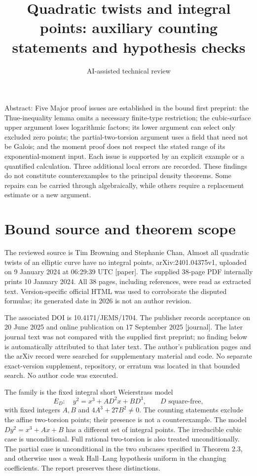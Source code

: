 \documentclass[10pt]{article}
\title{Quadratic twists and integral points: auxiliary counting statements and hypothesis checks}
\author{AI-assisted technical review}
\date{}
\begin{document}
\maketitle
Abstract: Five Major proof issues are established in the bound first preprint: the Thue-inequality lemma omits a necessary finite-type restriction; the cubic-surface upper argument loses logarithmic factors; its lower argument can select only excluded zero points; the partial-two-torsion argument uses a field that need not be Galois; and the moment proof does not respect the stated range of its exponential-moment input. Each issue is supported by an explicit example or a quantified calculation. Three additional local errors are recorded. These findings do not constitute counterexamples to the principal density theorems. Some repairs can be carried through algebraically, while others require a replacement estimate or a new argument.\par
\section*{Bound source and theorem scope}
The reviewed source is Tim Browning and Stephanie Chan, Almost all quadratic twists of an elliptic curve have no integral points, arXiv:2401.04375v1, uploaded on 9 January 2024 at 06:29:39 UTC [paper]. The supplied 38-page PDF internally prints 10 January 2024. All 38 pages, including references, were read as extracted text. Version-specific official HTML was used to corroborate the disputed formulas; its generated date in 2026 is not an author revision.\par
The associated DOI is 10.4171/JEMS/1704. The publisher records acceptance on 20 June 2025 and online publication on 17 September 2025 [journal]. The later journal text was not compared with the supplied first preprint; no finding below is automatically attributed to that later text. The author’s publication pages and the arXiv record were searched for supplementary material and code. No separate exact-version supplement, repository, or erratum was located in that bounded search. No author code was executed.\par
The family is the fixed integral short Weierstrass model \[E_D:\quad y^2=x^3+AD^2x+BD^3,\qquad D\text{ square-free},\] with fixed integers \(A,B\) and \(4A^3+27B^2\neq0\). The counting statements exclude the affine two-torsion points; their presence is not a counterexample. The model \(Dy^2=x^3+Ax+B\) has a different set of integral points. The irreducible cubic case is unconditional. Full rational two-torsion is also treated unconditionally. The partial case is unconditional in the two subcases specified in Theorem 2.3, and otherwise uses a weak Hall–Lang hypothesis uniform in the changing coefficients. The report preserves these distinctions.\par
\end{document}
